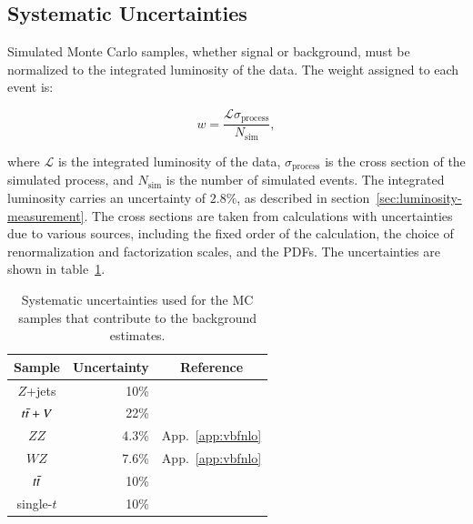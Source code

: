 \subsection{Systematic Uncertainties}\label{sec:prompt-background-uncertainties}
Simulated Monte Carlo samples, whether signal or background, must be normalized to the integrated luminosity of the data. The weight assigned to each event is:

\begin{equation}
	w = \frac{\mathcal{L} \sigma_{\mathrm{process}}}{N_{\mathrm{sim}}},
\end{equation}

where $\mathcal{L}$ is the integrated luminosity of the data, $\sigma_{\mathrm{process}}$ is the cross section of the simulated process, and $N_{\mathrm{sim}}$ is the number of simulated events. The integrated luminosity carries an uncertainty of $2.8\%$, as described in section~\ref{sec:luminosity-measurement}. The cross sections are taken from calculations with uncertainties due to various sources, including the fixed order of the calculation, the choice of renormalization and factorization scales, and the PDFs. The uncertainties are shown in table~\ref{table:model-independent-cross-section-uncertainties}. 

\begin{table}
  \begin{center}
    \begin{tabular}{c r c}
      \hline
      Sample     &Uncertainty &Reference\\
      \hline
      $Z$+jets   &10\% \\
      $t\bar{t}+V$ &22\% &\cite{ttV} \\
      $ZZ$       &4.3\% &App.~\ref{app:vbfnlo} \\
      $WZ$       &7.6\% &App.~\ref{app:vbfnlo}\\
      $t\bar{t}$   &10\% &\cite{TopXS} \\
      single-$t$ &10\% &\cite{atlas_topmc}\\
      \hline
    \end{tabular}
    \caption{Systematic uncertainties used for the MC samples that contribute to the background estimates.}
    \label{table:model-independent-cross-section-uncertainties}
  \end{center}
\end{table}



